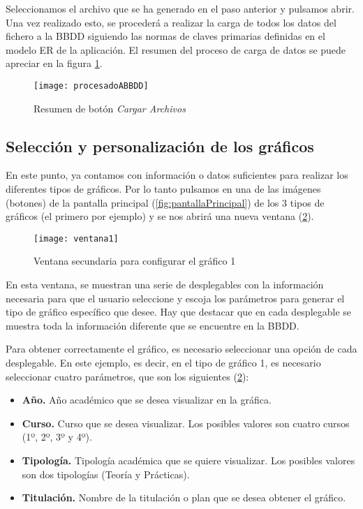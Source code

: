 Seleccionamos el archivo que se ha generado en el paso anterior y pulsamos abrir. Una vez realizado esto, se procederá a realizar la carga de todos los datos del fichero a la BBDD siguiendo las normas de claves primarias definidas en el modelo ER de la aplicación. El resumen del proceso de carga de datos se puede apreciar en la figura \ref{fig:procesadoABBDD}. 

\begin{figure}%
		\centering
		\texttt{[image: procesadoABBDD]}
		\caption{Resumen de botón \emph{Cargar Archivos}}\label{fig:procesadoABBDD}
	\end{figure}



\subsection{Selección y personalización de los gráficos}

En este punto, ya contamos con información o datos suficientes para realizar los diferentes tipos de gráficos.
Por lo tanto pulsamos en una de las imágenes (botones) de la pantalla principal (\ref{fig:pantallaPrincipal}) de los 3 tipos de gráficos (el primero por ejemplo) y se nos abrirá una nueva ventana (\ref{fig:ventana1}).

\begin{figure}%
		\centering
		\texttt{[image: ventana1]}
		\caption{Ventana secundaria para configurar el gráfico 1}\label{fig:ventana1}
	\end{figure}

En esta ventana, se muestran una serie de desplegables con la información necesaria para que el usuario seleccione y escoja los parámetros para generar el tipo de gráfico específico que desee. Hay que destacar que en cada desplegable se muestra toda la información diferente que se encuentre en la BBDD.

	
Para obtener correctamente el gráfico, es necesario seleccionar una opción de cada desplegable. En este ejemplo, es decir, en el tipo de gráfico 1, es necesario seleccionar cuatro parámetros, que son los siguientes (\ref{fig:ventana1}):


\begin{itemize}
\item \textbf{Año.} Año académico que se desea visualizar en la gráfica.
\item \textbf{Curso.} Curso que se desea visualizar. Los posibles valores son cuatro cursos (1º, 2º, 3º y 4º).
\item \textbf{Tipología.} Tipología académica que se quiere visualizar. Los posibles valores son dos tipologías (Teoría y Prácticas).
\item \textbf{Titulación.} Nombre de la titulación o plan que se desea obtener el gráfico.
\end{itemize}
   
